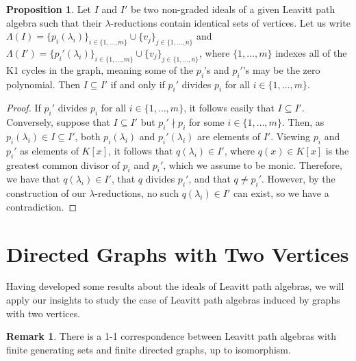 \documentclass[12pt]{amsart}
\theoremstyle{plain} \numberwithin{equation}{section}
\theoremstyle{definition}
\newtheorem{proposition}[theorem]{Proposition}
\newtheorem{remark}[theorem]{Remark}
\theoremstyle{definition}
\begin{document}
\begin{proposition}
    Let $I$ and $I'$ be two non-graded ideals of a given Leavitt path algebra such that their $\lambda$-reductions contain identical sets of vertices. Let us write $\Lambda(I) = \{p_i(\lambda_i)\}_{i\in\{1,\dots ,m\}} \cup \{v_j\}_{j\in\{1,\dots ,n\}}$ and $\Lambda(I') = \{p_i'(\lambda_i)\}_{i\in\{1,\dots ,m\}} \cup \{v_j\}_{j\in\{1,\dots ,n\}}$, where $\{1,\ldots,m\}$ indexes all of the K1 cycles in the graph, meaning some of the $p_i$'s and $p_i'$'s may be the zero polynomial. Then $I \subseteq I'$ if and only if $p_i'$ divides $p_i$ for all $i\in\{1,\dots ,m\}$. 
\end{proposition}
\begin{proof}
    If $p_i'$ divides $p_i$ for all $i\in\{1,\dots ,m\}$, it follows easily that $I \subseteq I'$. Conversely, suppose that $I\subseteq I'$ but $p_i' \nmid p_i$ for some $i\in\{1,\dots ,m\}$. Then, as $p_i(\lambda_i) \in I \subseteq I'$, both $p_i(\lambda_i)$ and $p_i'(\lambda_i)$ are elements of $I'$. Viewing $p_i$ and $p_i'$ as elements of $K[x]$, it follows that $q(\lambda_i) \in I'$, where $q(x) \in K[x]$ is the greatest common divisor of $p_i$ and $p_i'$, which we assume to be monic. Therefore, we have that $q(\lambda_i) \in I'$, that $q$ divides $p_i'$, and that $q \neq p_i'$. However, by the construction of our $\lambda$-reductions, no such $q(\lambda_i)\in I'$ can exist, so we have a contradiction.  
\end{proof}

\section*{Directed Graphs with Two Vertices}

Having developed some results about the ideals of Leavitt path algebras, we will apply our insights to study the case of Leavitt path algebras induced by graphs with two vertices. 

\begin{remark}
    There is a 1-1 correspondence between Leavitt path algebras with finite generating sets and finite directed graphs, up to isomorphism. 
\end{remark}
\end{document}
